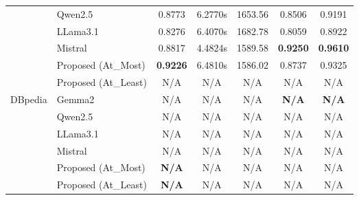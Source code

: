 \begin{table}[ht!]
{\begin{threeparttable}
\begin{tabular}{llccc||cc}
                                        & Qwen2.5                            & 0.8773                         & 6.2770s                            & 1653.56                                       & 0.8506    & 0.9191   \\
                                        & LLama3.1                           & 0.8276                         & 6.4070s                            & 1682.78                                       & 0.8059    & 0.8922   \\
                                        & Mistral                            & 0.8817                         & 4.4824s                            & 1589.58                                       & \textbf{0.9250}    & \textbf{0.9610}   \\ \cline{2-7}
                                        & Proposed (At\_Most)                & \textbf{0.9226}                & 6.4810s                            & 1586.02                                       & 0.8737    & 0.9325   \\
                                        & Proposed (At\_Least)               & N/A                            & N/A                            & N/A                                       & N/A    & N/A   \\ \hline \hline
            \multirow{6}{*}{DBpedia}    & Gemma2                             & N/A                          & N/A                            & N/A                                       & \textbf{N/A}    & \textbf{N/A }   \\
                                        & Qwen2.5                            & N/A                          & N/A                            & N/A                                       & N/A     & N/A    \\
                                        & LLama3.1                           & N/A                          & N/A                            & N/A                                       & N/A     & N/A    \\
                                        & Mistral                            & N/A                          & N/A                            & N/A                                       & N/A     & N/A    \\ \cline{2-7}
                                        & Proposed (At\_Most)                & \textbf{N/A }                & N/A                            & N/A                                       & N/A     & N/A    \\
                                        & Proposed (At\_Least)               & \textbf{N/A }                & N/A                            & N/A                                       & N/A     & N/A    \\


\end{tabular}
\end{threeparttable}}
\end{table}

